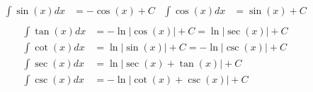 \begin{theorem}
  \[\begin{aligned}
    \int \sin(x) dx &= -\cos(x) + C & \int \cos(x) dx &= \sin(x) + C \\
  \end{aligned}\]
  \[\begin{aligned}
    \int \tan(x) dx &= -\ln |\cos(x)| + C = \ln |\sec(x)| + C \\
    \int \cot(x) dx &= \ln |\sin(x)| + C = -\ln |\csc(x)| + C \\
    \int \sec(x) dx &= \ln |\sec(x) + \tan(x)| + C \\
    \int \csc(x) dx &= -\ln |\cot(x) + \csc(x)| + C
  \end{aligned}\]
\end{theorem}


  

  
  
  
  



